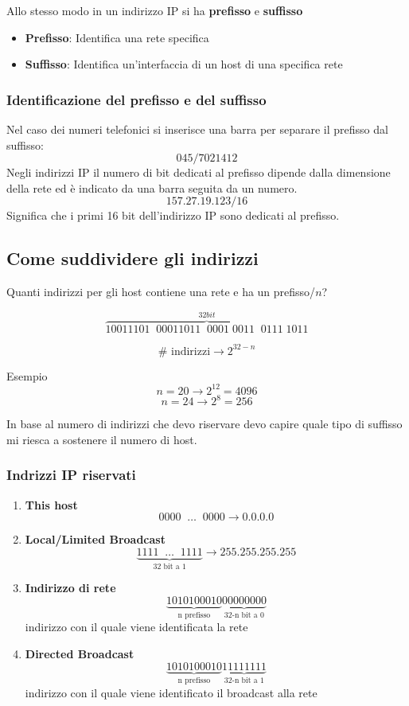 \documentclass[a4paper]{article}
\begin{document}
\vspace{1em}
\noindent
Allo stesso modo in un indirizzo IP si ha \textbf{prefisso} e \textbf{suffisso}
\begin{itemize}
  \item \textbf{Prefisso}: Identifica una rete specifica
  \item \textbf{Suffisso}: Identifica un'interfaccia di un host di una specifica rete 
\end{itemize}

\subsubsection{Identificazione del prefisso e del suffisso}
Nel caso dei numeri telefonici si inserisce una barra per separare il prefisso dal suffisso:
\[
  045/7021412
\]
Negli indirizzi IP il numero di bit dedicati al prefisso dipende dalla dimensione della
rete ed è indicato da una barra seguita da un numero.
\[
  157.27.19.123/16
\] 
Significa che i primi 16 bit dell'indirizzo IP sono dedicati al prefisso.


\subsection{Come suddividere gli indirizzi}


Quanti indirizzi per gli host contiene una rete e ha un prefisso/$n$?

\[
    \overbrace{10011101 \;\; 00011011 \;\; 0001 \; 0011 \;\; 0111 \; 1011}^{32 bit}
\] 

\[\# \text{ indirizzi} \rightarrow 2^{32-n}\]
\begin{examplebox}{Esempio}
\[n = 20 \rightarrow 2^{12} = 4096\]
\[n = 24 \rightarrow 2^8 = 256\]
\end{examplebox}
In base al numero di indirizzi che devo riservare devo capire quale tipo di suffisso mi riesca a sostenere il numero di host.

\subsubsection{Indrizzi IP riservati}
\begin{enumerate}
    \item \textbf{This host} \[0000 \;\; \dots \; \; 0000 \rightarrow 0.0.0.0\]
    \item \textbf{Local/Limited Broadcast } \[ \underbrace{1111 \;\; \dots \; \; 1111}_{\text{32 bit a 1}} \rightarrow 255.255.255.255\]
    \item \textbf{Indirizzo di rete} \[ \underbrace{1010100010}_{\text{n prefisso}} \underbrace{00000000}_{\text{32-n bit a 0}}\]
    indirizzo con il quale viene identificata la rete
    \item \textbf{Directed Broadcast} \[ \underbrace{1010100010}_{\text{n prefisso}} \underbrace{11111111}_{\text{32-n bit a 1}}\] 
    indirizzo con il quale viene identificato il broadcast alla rete
\end{enumerate}
\end{document}
